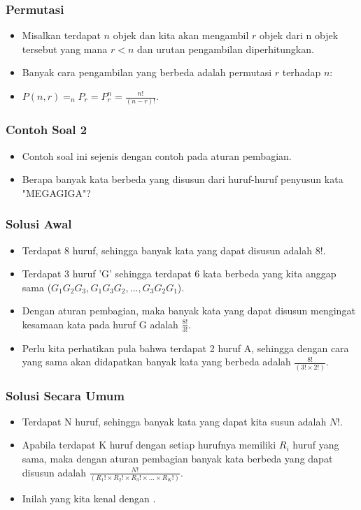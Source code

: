 \begin{frame}
\frametitle{Permutasi}
\begin{itemize}
  \item Misalkan terdapat $n$ objek dan kita akan mengambil $r$ objek dari n objek tersebut yang mana $r<n$ dan urutan pengambilan diperhitungkan.
  \item Banyak cara pengambilan yang berbeda adalah permutasi $r$ terhadap $n$: 
  \item $P(n,r) = _{n}P_{r} = P^{n}_{r} = \frac{n!}{(n-r)!}$.
\end{itemize}
\end{frame}

\begin{frame}
\frametitle{Contoh Soal 2}
\begin{itemize}
  \item Contoh soal ini sejenis dengan contoh pada aturan pembagian.
  \item Berapa banyak kata berbeda yang disusun dari huruf-huruf penyusun kata "MEGAGIGA"?
\end{itemize}
\end{frame}

\begin{frame}
\frametitle{Solusi Awal}
\begin{itemize}
  \item Terdapat 8 huruf, sehingga banyak kata yang dapat disusun adalah $8!$.
  \item Terdapat 3 huruf 'G' sehingga terdapat 6 kata berbeda yang kita anggap sama ($G_{1}G_{2}G_{3}, G_{1}G_{3}G_{2}, ...,G_{3}G_{2}G_{1}$).
  \item Dengan aturan pembagian, maka banyak kata yang dapat disusun mengingat kesamaan kata pada huruf G adalah $\frac{8!}{3!}$.
  \item Perlu kita perhatikan pula bahwa terdapat 2 huruf A, sehingga dengan cara yang sama akan didapatkan banyak kata yang berbeda adalah $\frac{8!}{(3! \times 2!)}$.
\end{itemize}
\end{frame}

\begin{frame}
\frametitle{Solusi Secara Umum}
\begin{itemize}
  \item Terdapat N huruf, sehingga banyak kata yang dapat kita susun adalah $N!$.
  \item Apabila terdapat K huruf dengan setiap hurufnya memiliki $R_{i}$ huruf yang sama, maka dengan aturan pembagian banyak kata berbeda yang dapat disusun adalah $\frac{N!}{(R_{1}! \times R_{2}! \times R_{3}! \times ... \times R_{K}!)}$.
  \item Inilah yang kita kenal dengan .
\end{itemize}
\end{frame}

